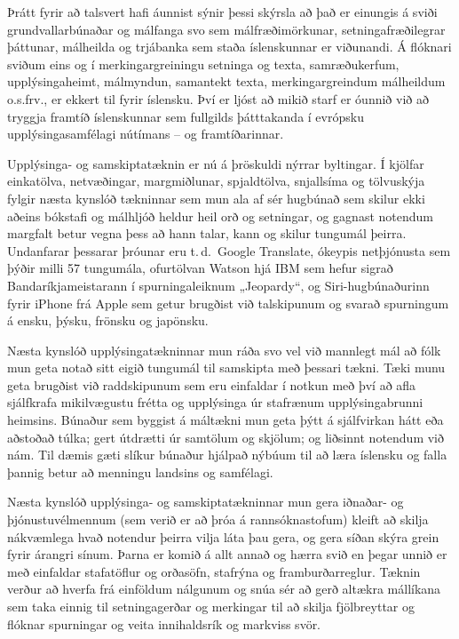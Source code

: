 \begin{multicols}{2}
Þrátt fyrir að talsvert hafi áunnist sýnir þessi skýrsla að það er einungis á sviði grundvallarbúnaðar og málfanga svo sem málfræðimörkunar, setningafræðilegrar þáttunar, málheilda og trjábanka sem staða íslenskunnar er viðunandi. Á flóknari sviðum eins og í merkingargreiningu setninga og texta, samræðukerfum, upplýsingaheimt, málmyndun, samantekt texta, merkingargreindum málheildum o.s.frv., er ekkert til fyrir íslensku. Því er ljóst að mikið starf er óunnið við að tryggja framtíð íslenskunnar sem fullgilds þátttakanda í evrópsku upplýsingasamfélagi nútímans -- og framtíðarinnar.

Upplýsinga- og samskiptatæknin er nú á þröskuldi nýrrar byltingar. Í kjölfar einkatölva, netvæðingar, margmiðlunar, spjaldtölva, snjallsíma og tölvuskýja fylgir næsta kynslóð tækninnar sem mun ala af sér hugbúnað sem skilur ekki aðeins bókstafi og málhljóð heldur heil orð og setningar, og gagnast notendum margfalt betur vegna þess að hann talar, kann og skilur tungumál þeirra. Undanfarar þessarar þróunar eru t.\,d.~Google Translate, ókeypis netþjónusta sem þýðir milli 57 tungumála, ofurtölvan Watson hjá IBM sem hefur sigrað Bandaríkjameistarann í spurningaleiknum „Jeopardy“, og Siri-hugbúnaðurinn fyrir iPhone frá Apple sem getur brugðist við talskipunum og svarað spurningum á ensku, þýsku, frönsku og japönsku.

Næsta kynslóð upplýsingatækninnar mun ráða svo vel við mannlegt mál að fólk mun geta notað sitt eigið tungumál til samskipta með þessari tækni. Tæki munu geta brugðist við raddskipunum sem eru einfaldar í notkun með því að afla sjálfkrafa mikilvægustu frétta og upplýsinga úr stafrænum upplýsingabrunni heimsins. Búnaður sem byggist á máltækni mun geta þýtt á sjálfvirkan hátt eða aðstoðað túlka; gert útdrætti úr samtölum og skjölum; og liðsinnt notendum við nám. Til dæmis gæti slíkur búnaður hjálpað nýbúum til að læra íslensku og falla þannig betur að menningu landsins og samfélagi.

Næsta kynslóð upplýsinga- og samskiptatækninnar mun gera iðnaðar- og þjónustuvélmennum (sem verið er að þróa á rannsóknastofum) kleift að skilja nákvæmlega hvað notendur þeirra vilja láta þau gera, og gera síðan skýra grein fyrir árangri sínum. Þarna er komið á allt annað og hærra svið en þegar unnið er með einfaldar stafatöflur og orðasöfn, stafrýna og framburðarreglur. Tæknin verður að hverfa frá einföldum nálgunum og snúa sér að gerð altækra mállíkana sem taka einnig til setningagerðar og merkingar til að skilja fjölbreyttar og flóknar spurningar og veita innihaldsrík og markviss svör.


\end{multicols}
